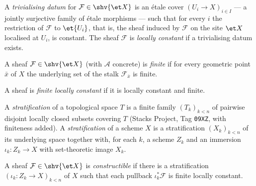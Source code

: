 \begin{definition}
\label{def:constructible-locally-constant}
\leanok
A \emph{trivialising datum} for $\mathcal F\in\shv{\et X}$ is an \'etale
cover $(U_i\to X)_{i\in I}$ --- a jointly surjective family of \'etale
morphisms --- such that for every $i$ the restriction of $\mathcal F$ to
$\et{U_i}$, that is, the sheaf induced by $\mathcal F$ on the site
$\et X$ localised at $U_i$, is constant.  The sheaf $\mathcal F$ is
\emph{locally constant} if a trivialising datum exists.
\end{definition}

\begin{definition}\label{def:constructible-finite}
\leanok
A sheaf $\mathcal F\in\shv{\et X}$ (with $\mathcal A$ concrete) is
\emph{finite} if for every geometric point $\bar x$ of $X$ the underlying
set of the stalk $\mathcal F_{\bar x}$ is finite.
\end{definition}

\begin{definition}
\label{def:constructible-finite-locally-constant}
\leanok
A sheaf is \emph{finite locally constant} if it is locally constant and
finite.
\end{definition}

\begin{definition}[Stratifications]\label{def:constructible-stratification}
\leanok
A \emph{stratification} of a topological space $T$ is a finite family
$(T_k)_{k<n}$ of pairwise disjoint locally closed subsets covering $T$
(Stacks Project, Tag \texttt{09XZ}, with finiteness added).  A
\emph{stratification} of a scheme $X$ is a stratification $(X_k)_{k<n}$ of
its underlying space together with, for each $k$, a scheme $Z_k$ and an
immersion $\iota_k\colon Z_k\to X$ with set-theoretic image $X_k$.
\end{definition}

\begin{definition}\label{def:constructible-constructible}
\leanok
A sheaf $\mathcal F\in\shv{\et X}$ is \emph{constructible} if there is a
stratification $(\iota_k\colon Z_k\to X)_{k<n}$ of $X$ such that each
pullback $\iota_k^*\mathcal F$ is finite locally constant.
\end{definition}

